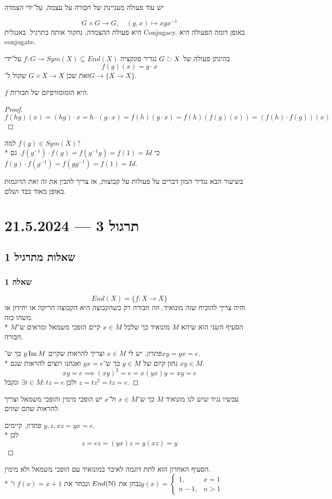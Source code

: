 יש עוד פעולה מעניינת של חבורה על עצמה, על־ידי הצמדה
\begin{definition}[הצמדה]
	\[
		G \times G \to G, \quad (g, x) \mapsto x g x^{-1}
	\]
	היא פעולת ההצמדה, נחקור אותה בתרגיל. באנגלית Conjugacy.
	באופן דומה הפעולה היא conjugate.
\end{definition}

בהינתן פעולה של $G \circlearrowright X$ נגדיר פונקציה $f : G \to Sym(X) \subseteq End(X)$ על־ידי
\[
	f(g)(x) = g \cdot x
\]
זאת שכן $G \times X \to X$ שקול ל־$G \to \{ X \to X \}$.

\begin{proposition}
	$f$ היא הומומורפיזם של חבורות.
\end{proposition}
\begin{proof}
	\[
		f(hg)(x) = (hg) \cdot x = h \cdot (g \cdot x) = f(h)(g \cdot x) = f(h)(f(g)(x)) = (f(h) \cdot f(g))(x)
	\]
\end{proof}

למה $f(g) \in Sym(X)$? \\*
כי $f(g^{-1}) \cdot f(g) = f(g^{-1} g) = f(1) = Id$.
גם $f(g) \cdot f(g^{-1}) = f(g g^{-1}) = f(1) = Id$.

בשיעור הבא נגדיר המון דברים על פעולות על קבוצות, אז צריך להבין את זה ואת הדוגמות באופן מאוד כבד ושלם.

\section{תרגול 3 --- 21.5.2024}
\subsection{שאלות מתרגיל 1}
\subsubsection{שאלה 1}
\[
	End(X) = \{ f : X \to X \}
\]
והיה צריך להוכיח שזה מונואיד. וזה חבורה רק כשהקבוצה היא הקבוצה הריקה או יחידון או משהו כזה. \\*
הסעיף השני הוא שיהא $M$ מונואיד כך שלכל $x \in M$ קיים הופכי משמאל ומראים ש־$M$ חבורה.
\begin{proof}[פתרון]
	יש לי $x \in M$ וצריך להראות שקיים $y \operatorname{Im} M$ כך ש־$xy = yx = e$. \\*
	נתון קיום של $y \in M$ כך ש־$yx = e$ ואנחנו רוצים להראות שגם $xy \in M$.
	\[
		xy = e \implies {(xy)}^2 = e = x (yx) y = xy = e
	\]
	ולכן $\exists t \in M: tz = e$ ונקבל $z = tz^2 = tz = e$.
\end{proof}
עכשיו נגיד שיש לנו מונואיד $M$ כך ש־$x \in M$ ול־$x$ יש הופכי מימין והופכי משמאל וצריך להראות שהם שווים.
\begin{proof}[פתרון]
	קיימים $y, z, xz = yx = e$. \\*
	לכן
	\[
		z = ez = (yx) z = y (xz) = y
	\]
\end{proof}
הסעיף האחרון הוא לתת דוגמה לאיבר במונואיד עם הופכי משמאל ולא מימין. \\*
נבחן את $End(\mathbb{N})$ ונבחר את $f(x) = x + 1$ ו־$g(x) = \begin{cases}
	1, & x = 1 \\
	n - 1, & n > 1
\end{cases}$

